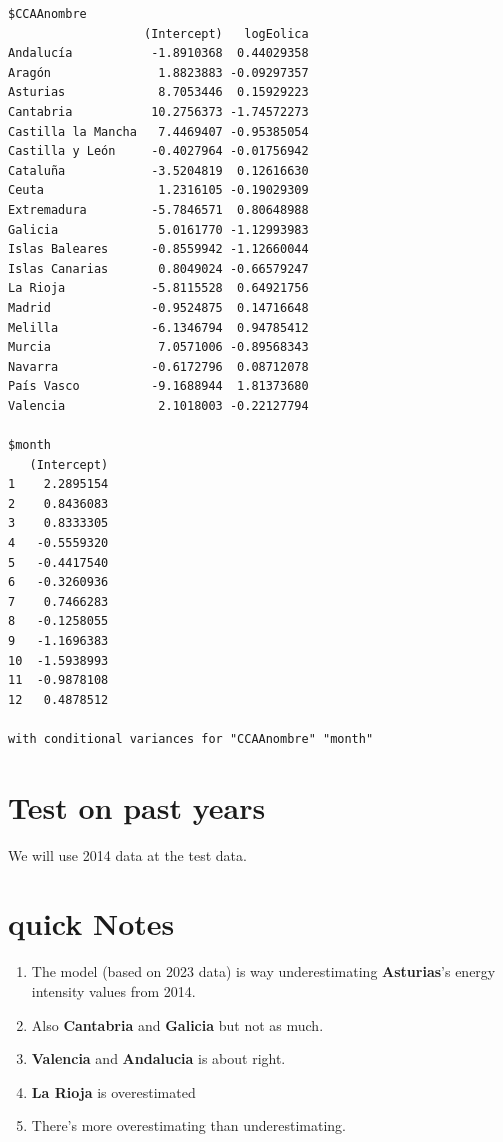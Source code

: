 \documentclass[
]{report}
\providecommand{\tightlist}{%
  \setlength{\itemsep}{0pt}\setlength{\parskip}{0pt}}\usepackage{longtable,booktabs,array}
\begin{document}
\begin{verbatim}
$CCAAnombre
                   (Intercept)   logEolica
Andalucía           -1.8910368  0.44029358
Aragón               1.8823883 -0.09297357
Asturias             8.7053446  0.15929223
Cantabria           10.2756373 -1.74572273
Castilla la Mancha   7.4469407 -0.95385054
Castilla y León     -0.4027964 -0.01756942
Cataluña            -3.5204819  0.12616630
Ceuta                1.2316105 -0.19029309
Extremadura         -5.7846571  0.80648988
Galicia              5.0161770 -1.12993983
Islas Baleares      -0.8559942 -1.12660044
Islas Canarias       0.8049024 -0.66579247
La Rioja            -5.8115528  0.64921756
Madrid              -0.9524875  0.14716648
Melilla             -6.1346794  0.94785412
Murcia               7.0571006 -0.89568343
Navarra             -0.6172796  0.08712078
País Vasco          -9.1688944  1.81373680
Valencia             2.1018003 -0.22127794

$month
   (Intercept)
1    2.2895154
2    0.8436083
3    0.8333305
4   -0.5559320
5   -0.4417540
6   -0.3260936
7    0.7466283
8   -0.1258055
9   -1.1696383
10  -1.5938993
11  -0.9878108
12   0.4878512

with conditional variances for "CCAAnombre" "month" 
\end{verbatim}

\hypertarget{test-on-past-years}{%
\section{Test on past years}\label{test-on-past-years}}

We will use 2014 data at the test data.

\hypertarget{quick-notes}{%
\section{quick Notes}\label{quick-notes}}

\begin{enumerate}
\def\labelenumi{\arabic{enumi}.}
\tightlist
\item
  The model (based on 2023 data) is way underestimating
  \textbf{Asturias}'s energy intensity values from 2014.
\item
  Also \textbf{Cantabria} and \textbf{Galicia} but not as much.
\item
  \textbf{Valencia} and \textbf{Andalucia} is about right.
\item
  \textbf{La Rioja} is overestimated
\item
  There's more overestimating than underestimating.
\end{enumerate}
\end{document}
